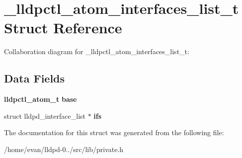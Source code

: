 \section{\-\_\-lldpctl\-\_\-atom\-\_\-interfaces\-\_\-list\-\_\-t \-Struct \-Reference}
\label{struct__lldpctl__atom__interfaces__list__t}


\-Collaboration diagram for \-\_\-lldpctl\-\_\-atom\-\_\-interfaces\-\_\-list\-\_\-t\-:
\subsection*{\-Data \-Fields}
\begin{DoxyCompactItemize}
\item 
{\bf lldpctl\-\_\-atom\-\_\-t} {\bfseries base}\label{struct__lldpctl__atom__interfaces__list__t_add397d02e5d3c1626944dc981febfa0f}

\item 
struct lldpd\-\_\-interface\-\_\-list $\ast$ {\bfseries ifs}\label{struct__lldpctl__atom__interfaces__list__t_a9011b8643a270b253c78db389fafb042}

\end{DoxyCompactItemize}


\-The documentation for this struct was generated from the following file\-:\begin{DoxyCompactItemize}
\item 
/home/evan/lldpd-\/0../src/lib/private.\-h\end{DoxyCompactItemize}
